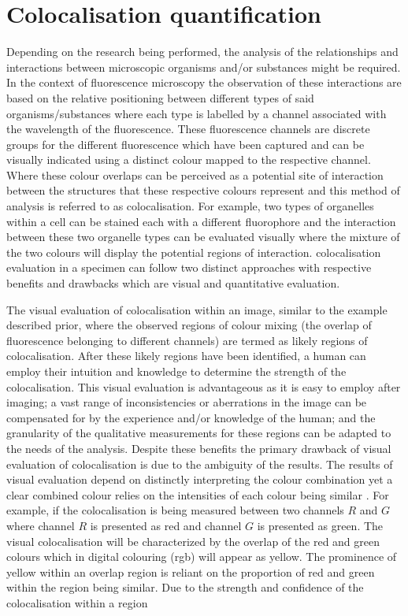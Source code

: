 \section{Colocalisation quantification}
Depending on the research being performed, the analysis of the relationships and interactions between microscopic organisms and/or substances might be required. In the context of fluorescence microscopy the observation of these interactions are based on the relative positioning between different types of said organisms/substances where each type is labelled by a channel associated with the wavelength of the fluorescence. These fluorescence channels are discrete groups for the different fluorescence which have been captured and can be visually indicated using a distinct colour mapped to the respective channel. Where these colour overlaps can be perceived as a potential site of interaction between the structures that these respective colours represent and this method of analysis is referred to as colocalisation. For example, two types of organelles within a cell can be stained each with a different fluorophore and the interaction between these two organelle types can be evaluated visually where the mixture of the two colours will display the potential regions of interaction. colocalisation evaluation in a specimen can follow two distinct approaches with respective benefits and drawbacks which are visual and quantitative evaluation.\par The visual evaluation of colocalisation within an image, similar to the example described prior, where the observed regions of colour mixing (the overlap of fluorescence belonging to different channels) are termed as likely regions of colocalisation. After these likely regions have been identified, a human can employ their intuition and knowledge to determine the strength of the colocalisation. This visual evaluation is advantageous as it is easy to employ after imaging; a vast range of inconsistencies or aberrations in the image can be compensated for by the experience and/or knowledge of the human; and the granularity of the qualitative measurements for these regions can be adapted to the needs of the analysis. Despite these benefits the primary drawback of visual evaluation of colocalisation is due to the ambiguity of the results. The results of visual evaluation depend on distinctly interpreting the colour combination yet a clear combined colour relies on the intensities of each colour being similar \cite{practical_guide_coloc}. For example, if the colocalisation is being measured between two channels $R$ and $G$ where channel $R$ is presented as red and channel $G$ is presented as green. The visual colocalisation will be characterized by the overlap of the red and green colours which in digital colouring (\gls{rgb}) will appear as yellow. The prominence of yellow within an overlap region is reliant on the proportion of red and green within the region being similar. Due to the strength and confidence of the colocalisation within a region 